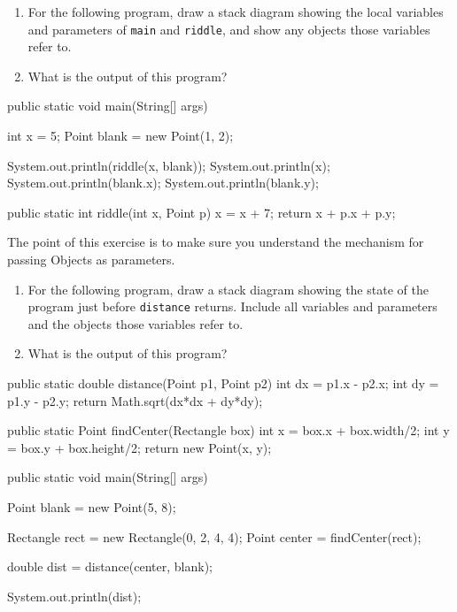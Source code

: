 \begin{exercise}
\begin{enumerate}

\item For the following program, draw a stack diagram showing the
local variables and parameters of {\tt main} and {\tt riddle}, and show
any objects those variables refer to.

\item What is the output of this program?

\end{enumerate}

\begin{code}
public static void main(String[] args)
{
    int x = 5;
    Point blank = new Point(1, 2);

    System.out.println(riddle(x, blank));
    System.out.println(x);
    System.out.println(blank.x);
    System.out.println(blank.y);
}

public static int riddle(int x, Point p)
{
    x = x + 7;
    return x + p.x + p.y;
}
\end{code}

The point of this exercise is to make sure you understand the
mechanism for passing Objects as parameters.
\end{exercise}


\begin{exercise}
\begin{enumerate}

\item For the following program, draw a stack diagram showing the
state of the program just before {\tt distance} returns.  Include all
variables and parameters and the objects those variables refer to.

\item What is the output of this program?

\end{enumerate}

\begin{code}
public static double distance(Point p1, Point p2) {
    int dx = p1.x - p2.x;
    int dy = p1.y - p2.y;
    return Math.sqrt(dx*dx + dy*dy);
}

public static Point findCenter(Rectangle box) {
    int x = box.x + box.width/2;
    int y = box.y + box.height/2;
    return new Point(x, y);
}

public static void main(String[] args) {
    Point blank = new Point(5, 8);

    Rectangle rect = new Rectangle(0, 2, 4, 4);
    Point center = findCenter(rect);

    double dist = distance(center, blank);

    System.out.println(dist);
}
\end{code}
%
\end{exercise}



